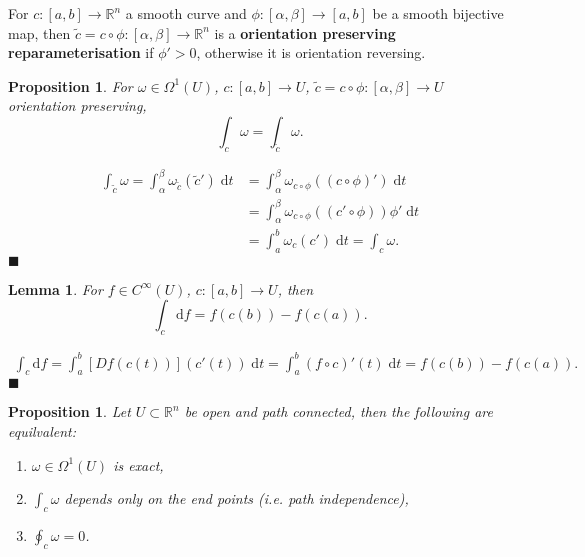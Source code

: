 \documentclass[letter-paper]{tufte-book}
\newtheorem{lemma}[theorem]{\color{pastel-blue}Lemma}
\newtheorem{proposition}[theorem]{\color{pastel-blue}Proposition}
\newenvironment{proof}[1][Proof]{\begin{trivlist}
\item[\hskip \labelsep {\bfseries #1}]}{\end{trivlist}}
\newcommand{\qed}{\hfill$\blacksquare$}
\begin{document}
For $c:[a,b] \to \mathbb{R}^n$ a smooth curve and $\phi : [\alpha,\beta] \to
[a,b]$ be a smooth bijective map, then $\tilde{c} = c\circ \phi : [\alpha,
\beta] \to \mathbb{R}^n$ is a \textbf{orientation preserving reparameterisation}
if $\phi' > 0$, otherwise it is orientation reversing.

\begin{proposition}
  For $\omega \in \Omega^1(U)$, $c:[a,b] \to U$, $\tilde{c} = c\circ \phi :
  [\alpha, \beta] \to U$ orientation preserving,
  \begin{equation*}
    \int_c \omega = \int_{\tilde{c}} \omega.
  \end{equation*}
\end{proposition}

\begin{proof}
  \begin{align*}
    \int_{\tilde{c}} \omega = \int_\alpha^\beta \omega_{\tilde c}(\tilde{c}')\; \mathrm{d}t
      &= \int_\alpha^\beta \omega_{c\circ\phi} \left((c\circ\phi)'\right)\; \mathrm{d}t\\
      &=\int_\alpha^\beta \omega_{c\circ\phi} \left((c'\circ\phi)\right)\phi'\; \mathrm{d}t\\
      &=\int_a^b \omega_{c} \left(c'\right)\; \mathrm{d}t = \int_c \omega.
  \end{align*}
  \qed
\end{proof}

\begin{lemma}
  For $f \in C^\infty(U)$, $c:[a,b] \to U$, then
  \begin{equation*}
    \int_c \mathrm{d}f = f(c(b)) - f(c(a)).
  \end{equation*}
\end{lemma}

\begin{proof}
  \begin{align*}
    \int_c \mathrm{d}f = \int_a^b \left[Df(c(t))\right](c'(t))\; \mathrm{d}t = \int_a^b (f\circ c)'(t)\; \mathrm{d}t = f(c(b)) - f(c(a)).
  \end{align*}
  \qed
\end{proof}

\begin{proposition}
  Let $U\subset\mathbb{R}^n$ be open and path connected, then the following are
  equilvalent:
  \begin{enumerate}
    \item $\omega \in \Omega^1(U)$ is exact,
    \item $\int_c \omega$ depends only on the end points (i.e. path
    independence),
    \item $\oint_c \omega = 0$.
  \end{enumerate}
\end{proposition}
\end{document}
